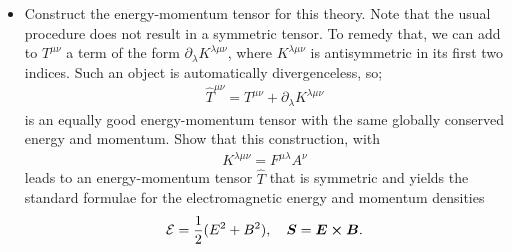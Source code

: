 {\begin{parts}
\begin{itemize}
            \item Construct the energy-momentum tensor for this theory.
                Note that the usual procedure does not result in a symmetric tensor.
                To remedy that, we can add to $T^{\mu\nu}$ a term of the form $\partial_{\lambda} K^{\lambda \mu\nu}$, where $K^{\lambda \mu\nu}$ is antisymmetric in its first two indices.
                Such an object is automatically divergenceless, so; 
                \begin{align}
                    \hat{T}^{\mu\nu} = T^{\mu\nu} + \partial_{\lambda} K^{\lambda \mu\nu}
                \end{align}
                is an equally good energy-momentum tensor with the same globally conserved energy and momentum.
                Show that this construction, with 
                \begin{align}
                    K^{\lambda \mu\nu} = F^{\mu\lambda} A^{\nu}
                \end{align}
                leads to an energy-momentum tensor $\hat{T}$ that is symmetric and yields the standard formulae for the electromagnetic energy and momentum densities
                \begin{align}
                    \mathcal{E} = \frac{1}{2}(E^2 + B^2), \quad \vb*{S} = \vb*{E} \cross \vb*{B}
                .\end{align}

    
        \end{itemize}
   
\end{parts}

}

